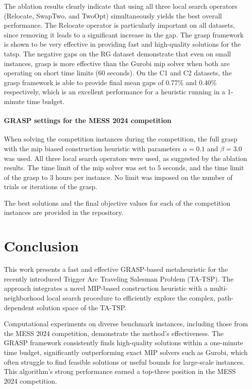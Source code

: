 \documentclass[twocolumn]{article} %
\begin{document}
The ablation results clearly indicate that using all three local search operators (Relocate, SwapTwo, and TwoOpt) simultaneously yields the best overall performance.
The Relocate operator is particularly important on all datasets, since removing it leads to a significant increase in the gap.
The \gls{grasp} framework is shown to be very effective in providing fast and high-quality solutions for the \gls{tatsp}.
The negative gaps on the RG dataset demonstrate that even on small instances, \gls{grasp} is more effective than the Gurobi \gls{mip} solver when both are operating on short time limits (60 seconds).
On the C1 and C2 datasets, the \gls{grasp} framework is able to provide final mean gaps of 0.77\% and 0.40\% respectively, which is an excellent performance for a heuristic running in a 1-minute time budget.

\paragraph{GRASP settings for the MESS 2024 competition}
\label{sec:grasp_settings_for_competition}

When solving the competition instances during the competition, the full \gls{grasp} with the \gls{mip} biased construction heuristic with parameters $\alpha = 0.1$ and $\beta = 3.0$ was used.
All three local search operators were used, as suggested by the ablation results.
The time limit of the \gls{mip} solver was set to 5 seconds, and the time limit of the \gls{grasp} to 3 hours per instance.
No limit was imposed on the number of trials or iterations of the \gls{grasp}.

The best solutions and the final objective values for each of the competition instances are provided in the repository.

\section{Conclusion}
This work presents a fast and effective GRASP-based metaheuristic for the recently introduced Trigger Arc Traveling Salesman Problem (TA-TSP). The approach integrates a novel MIP-based construction heuristic with a multi-neighborhood local search procedure to efficiently explore the complex, path-dependent solution space of the TA-TSP.

Computational experiments on diverse benchmark instances, including those from the MESS 2024 competition, demonstrate the method’s effectiveness. The GRASP framework consistently finds high-quality solutions within a one-minute time budget, significantly outperforming exact MIP solvers such as Gurobi, which often struggle to find feasible solutions or useful bounds for large-scale instances. This algorithm’s strong performance earned a top-three position in the MESS 2024 competition.
\end{document}

